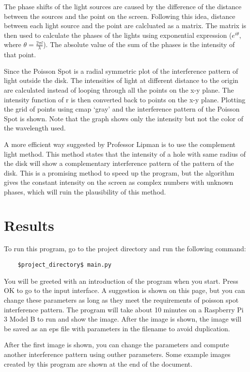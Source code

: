 \documentclass[12pt]{article}
\begin{document}
The phase shifts of the light sources are caused by the 
difference of the distance between the sources and the 
point on the screen. Following this idea, distance between 
each light source and the point are calcluated as a matrix.
The matrix is then used to calculate the phases of the lights 
using exponential expression ($e^{i\theta}$, where $\theta = \frac{2 \pi l}{\lambda}$). 
The absolute value of the sum of the phases is the intensity 
of that point. 

Since the Poisson Spot is a radial symmetric plot of the 
interference pattern of light outside the disk. The intensities 
of light at different distance to the origin are calculated 
instead of looping through all the points on the x-y plane. 
The intensity function of r is then converted back to points 
on the x-y plane. Plotting the grid of points using cmap 
`gray' and the interference pattern of the 
Poisson Spot is shown. Note that the graph shows only the intensity 
but not the color of the wavelength used.

A more efficient way suggested by Professor Lipman is to use the 
complement light method. This method states that the intensity 
of a hole with same radius of the disk will show a complementary
interference pattern of the pattern of the disk. This is a 
promising method to speed up the program, but the algorithm gives
the constant intensity on the screen as complex numbers with 
unknown phases, which will ruin the plausibility of this method. 

\section{Results}

To run this program, go to the project directory and run
the following command:
{\selectfont 
\begin{lstlisting}
    $project_directory$ main.py
\end{lstlisting}
}

You will be greeted with an introduction of the program 
when you start. Press OK to go to the input interface.
A suggestion is shown on this page, but you can change 
these parameters as long as they meet the requirements
of poisson spot interference pattern. The program will
take about 10 minutes on a Raspberry Pi 3 Model B to run
and show the image. After the image is shown, 
the image will be saved as an eps
file with parameters in the filename to avoid duplication.

After the first image is shown, you can change the parameters
and compute another interference pattern using outher 
parameters. Some example images created by
this program are shown at the end of the document.
\end{document}

